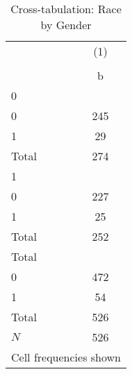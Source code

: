 \begin{table}[htbp]\centering
\def\sym#1{\ifmmode^{#1}\else\(^{#1}\)\fi}
\caption{Cross-tabulation: Race by Gender}\label{tab:0201-crosstab_race_gender}
\begin{tabular}{l*{1}{c}}
\toprule
            &\multicolumn{1}{c}{(1)}\\
            &\multicolumn{1}{c}{}\\
            &           b\\
\midrule
0           &            \\
0           &         245\\
1           &          29\\
Total       &         274\\
\midrule
1           &            \\
0           &         227\\
1           &          25\\
Total       &         252\\
\midrule
Total       &            \\
0           &         472\\
1           &          54\\
Total       &         526\\
\midrule
\(N\)       &         526\\
\bottomrule
\multicolumn{2}{l}{\footnotesize Cell frequencies shown}\\
\end{tabular}
\end{table}
